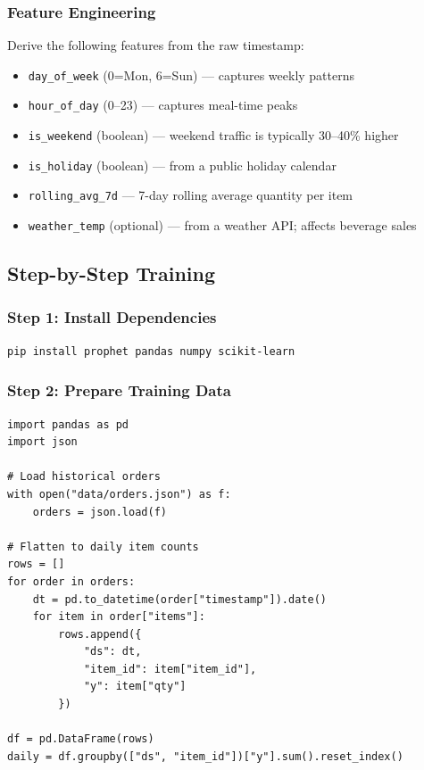 \documentclass[12pt, a4paper]{article}
\begin{document}
\subsubsection{Feature Engineering}
Derive the following features from the raw timestamp:
\begin{itemize}[nosep]
    \item \texttt{day\_of\_week} (0=Mon, 6=Sun) --- captures weekly patterns
    \item \texttt{hour\_of\_day} (0--23) --- captures meal-time peaks
    \item \texttt{is\_weekend} (boolean) --- weekend traffic is typically 30--40\% higher
    \item \texttt{is\_holiday} (boolean) --- from a public holiday calendar
    \item \texttt{rolling\_avg\_7d} --- 7-day rolling average quantity per item
    \item \texttt{weather\_temp} (optional) --- from a weather API; affects beverage sales
\end{itemize}


\subsection{Step-by-Step Training}

\subsubsection{Step 1: Install Dependencies}
\begin{lstlisting}[language=bash]
pip install prophet pandas numpy scikit-learn
\end{lstlisting}

\subsubsection{Step 2: Prepare Training Data}
\begin{lstlisting}
import pandas as pd
import json

# Load historical orders
with open("data/orders.json") as f:
    orders = json.load(f)

# Flatten to daily item counts
rows = []
for order in orders:
    dt = pd.to_datetime(order["timestamp"]).date()
    for item in order["items"]:
        rows.append({
            "ds": dt,
            "item_id": item["item_id"],
            "y": item["qty"]
        })

df = pd.DataFrame(rows)
daily = df.groupby(["ds", "item_id"])["y"].sum().reset_index()
\end{lstlisting}
\end{document}
